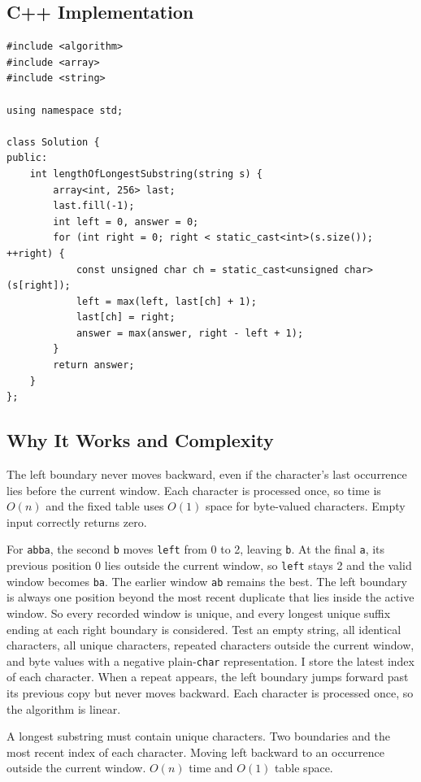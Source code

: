 \subsection{C++ Implementation}
\begin{lstlisting}[style=compactcode,caption={Complete C++ solution: Longest Substring Without Repeats}]
#include <algorithm>
#include <array>
#include <string>

using namespace std;

class Solution {
public:
    int lengthOfLongestSubstring(string s) {
        array<int, 256> last;
        last.fill(-1);
        int left = 0, answer = 0;
        for (int right = 0; right < static_cast<int>(s.size()); ++right) {
            const unsigned char ch = static_cast<unsigned char>(s[right]);
            left = max(left, last[ch] + 1);
            last[ch] = right;
            answer = max(answer, right - left + 1);
        }
        return answer;
    }
};
\end{lstlisting}

\subsection{Why It Works and Complexity}
The left boundary never moves backward, even if the character's last
occurrence lies before the current window. Each character is processed once,
so time is \(O(n)\) and the fixed table uses \(O(1)\) space for byte-valued
characters. Empty input correctly returns zero.

\lessonexpansion
  {For \texttt{abba}, the second \texttt{b} moves \texttt{left} from 0 to 2,
   leaving \texttt{b}. At the final \texttt{a}, its previous position 0 lies
   outside the current window, so \texttt{left} stays 2 and the valid window
   becomes \texttt{ba}. The earlier window \texttt{ab} remains the best.}
  {The left boundary is always one position beyond the most recent duplicate
   that lies inside the active window. So every recorded window is
   unique, and every longest unique suffix ending at each right boundary is
   considered.}
  {Test an empty string, all identical characters, all unique characters,
   repeated characters outside the current window, and byte values with a
   negative plain-\texttt{char} representation.}
  {I store the latest index of each character. When a repeat appears, the left
   boundary jumps forward past its previous copy but never moves backward.
   Each character is processed once, so the algorithm is linear.}

\chaptercheckpoint
  {A longest substring must contain unique characters.}
  {Two boundaries and the most recent index of each character.}
  {Moving left backward to an occurrence outside the current window.}
  {$O(n)$ time and $O(1)$ table space.}


